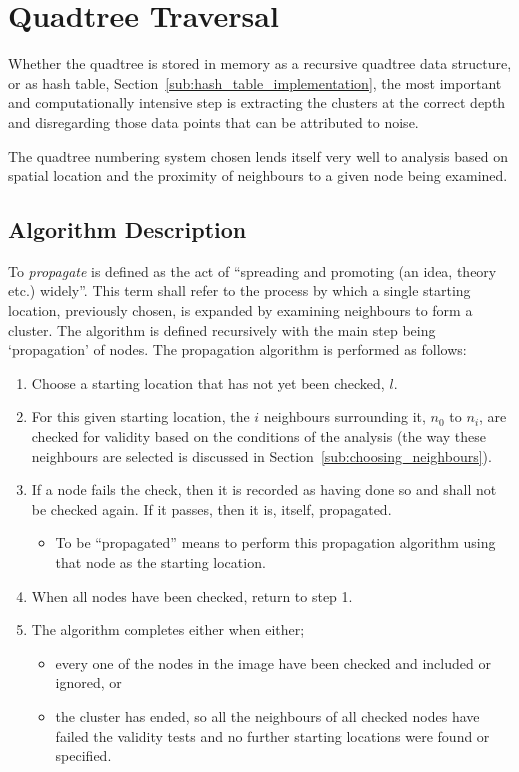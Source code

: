 
\section{Quadtree Traversal}
\label{sec:quadtree_traversal}

Whether the quadtree is stored in memory as a recursive quadtree data
structure, or as hash table, Section~\ref{sub:hash_table_implementation}, the
most important and computationally intensive step is extracting the clusters at
the correct depth and disregarding those data points that can be attributed to
noise.

The quadtree numbering system chosen lends itself very well to analysis based
on spatial location and the proximity of neighbours to a given node being
examined.

\subsection{Algorithm Description}
\label{sub:algorithm_description}

To \emph{propagate} is defined as the act of ``spreading and promoting (an
idea, theory etc.) widely''\cite{oed31}. This term shall refer to the process
by which a single starting location, previously chosen, is expanded by
examining neighbours to form a cluster. The algorithm is defined recursively
with the main step being `propagation' of nodes. The propagation algorithm is
performed as follows:

\begin{enumerate}
	\item Choose a starting location that has not yet been checked, $l$.
	\item For this given starting location, the $i$ neighbours surrounding it,
		$n_0$ to $n_i$, are checked for validity based on the conditions of the
		analysis (the way these neighbours are selected is discussed in
		Section~\ref{sub:choosing_neighbours}).
	\item If a node fails the check, then it is recorded as having done so and
		shall not be checked again. If it passes, then it is, itself,
		propagated.
		\begin{itemize}
			\item To be ``propagated'' means to perform this propagation
				algorithm using that node as the starting location.
		\end{itemize}
	\item When all nodes have been checked, return to step 1.
	\item The algorithm completes either when either;
	\begin{itemize}
		\item every one of the nodes in the image have been checked and
			included or ignored, or
		\item the cluster has ended, so all the neighbours of all checked nodes
			have failed the validity tests and no further starting locations
			were found or specified.
	\end{itemize}
\end{enumerate}

